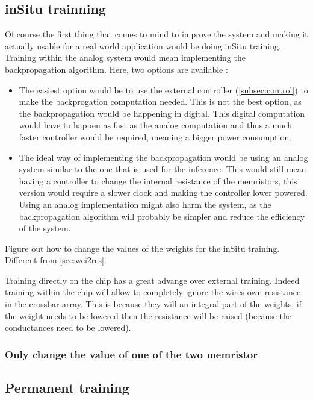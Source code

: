 \subsection{inSitu trainning}\label{subsec:inSitu}

Of course the first thing that comes to mind to improve the system and making it actually usable for a real world application would be doing inSitu training. Training within the analog system would mean implementing the backpropagation algorithm. Here, two options are available :

\begin{itemize}
  \item The easiest option would be to use the external controller (\cref{subsec:control}) to make the backprogation computation needed. This is not the best option, as the backpropagation would be happening in digital. This digital computation would have to happen as fast as the analog computation and thus a much faster controller would be required, meaning a bigger power consumption.
  \item The ideal way of implementing the backpropagation would be using an analog system similar to the one that is used for the inference. This would still mean having a controller to change the internal resistance of the memristors, this version would require a slower clock and making the controller lower powered. Using an analog implementation might also harm the system, as the backpropagation algorithm will probably be simpler and reduce the efficiency of the system.
\end{itemize}

Figure out how to change the values of the weights for the inSitu training. Different from \cref{sec:wei2res}.

Training directly on the chip has a great advange over external training. Indeed training within the chip will allow to completely ignore the wires own resistance in the crossbar array. This is because they will an integral part of the weights, if the weight needs to be lowered then the resistance will be raised (because the conductances need to be lowered). %

\subsubsection{Only change the value of one of the two memristor}%

\subsection{Permanent training}

